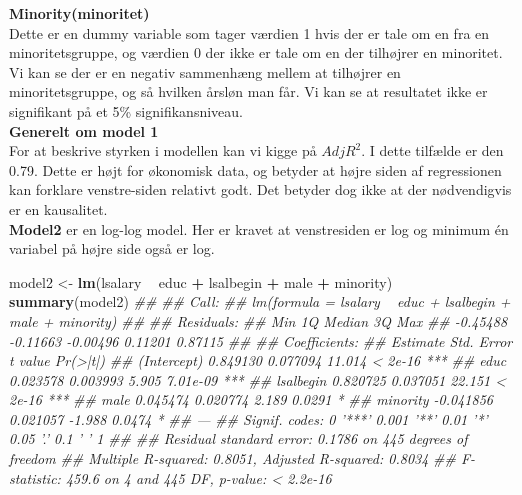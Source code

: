 \documentclass[
  10pt,
]{article}
\newenvironment{Shaded}{\begin{snugshade}}{\end{snugshade}}
\newcommand{\CommentTok}[1]{\textcolor[rgb]{0.56,0.35,0.01}{\textit{#1}}}
\newcommand{\KeywordTok}[1]{\textcolor[rgb]{0.13,0.29,0.53}{\textbf{#1}}}
\newcommand{\NormalTok}[1]{#1}
\newcommand{\OperatorTok}[1]{\textcolor[rgb]{0.81,0.36,0.00}{\textbf{#1}}}
\newcommand{\StringTok}[1]{\textcolor[rgb]{0.31,0.60,0.02}{#1}}
\begin{document}
\textbf{Minority(minoritet)}\\
Dette er en dummy variable som tager værdien 1 hvis der er tale om en
fra en minoritetsgruppe, og værdien 0 der ikke er tale om en der
tilhøjrer en minoritet. Vi kan se der er en negativ sammenhæng mellem at
tilhøjrer en minoritetsgruppe, og så hvilken årsløn man får. Vi kan se
at resultatet ikke er signifikant på et 5\% signifikansniveau.\\

\textbf{Generelt om model 1}\\
For at beskrive styrken i modellen kan vi kigge på \(AdjR^2\). I dette
tilfælde er den 0.79. Dette er højt for økonomisk data, og betyder at
højre siden af regressionen kan forklare venstre-siden relativt godt.
Det betyder dog ikke at der nødvendigvis er en kausalitet.\\

\textbf{Model2} er en log-log model. Her er kravet at venstresiden er
log og minimum én variabel på højre side også er log.

\begin{Shaded}
\begin{Highlighting}[]
\NormalTok{model2 <-}\StringTok{ }\KeywordTok{lm}\NormalTok{(lsalary }\OperatorTok{~}\StringTok{ }\NormalTok{educ }\OperatorTok{+}\StringTok{ }\NormalTok{lsalbegin }\OperatorTok{+}\StringTok{ }\NormalTok{male }\OperatorTok{+}\StringTok{ }\NormalTok{minority)}
\KeywordTok{summary}\NormalTok{(model2)}
\CommentTok{## }
\CommentTok{## Call:}
\CommentTok{## lm(formula = lsalary ~ educ + lsalbegin + male + minority)}
\CommentTok{## }
\CommentTok{## Residuals:}
\CommentTok{##      Min       1Q   Median       3Q      Max }
\CommentTok{## -0.45488 -0.11663 -0.00496  0.11201  0.87115 }
\CommentTok{## }
\CommentTok{## Coefficients:}
\CommentTok{##              Estimate Std. Error t value Pr(>|t|)    }
\CommentTok{## (Intercept)  0.849130   0.077094  11.014  < 2e-16 ***}
\CommentTok{## educ         0.023578   0.003993   5.905 7.01e-09 ***}
\CommentTok{## lsalbegin    0.820725   0.037051  22.151  < 2e-16 ***}
\CommentTok{## male         0.045474   0.020774   2.189   0.0291 *  }
\CommentTok{## minority    -0.041856   0.021057  -1.988   0.0474 *  }
\CommentTok{## ---}
\CommentTok{## Signif. codes:  0 '***' 0.001 '**' 0.01 '*' 0.05 '.' 0.1 ' ' 1}
\CommentTok{## }
\CommentTok{## Residual standard error: 0.1786 on 445 degrees of freedom}
\CommentTok{## Multiple R-squared:  0.8051, Adjusted R-squared:  0.8034 }
\CommentTok{## F-statistic: 459.6 on 4 and 445 DF,  p-value: < 2.2e-16}
\end{Highlighting}
\end{Shaded}
\end{document}
